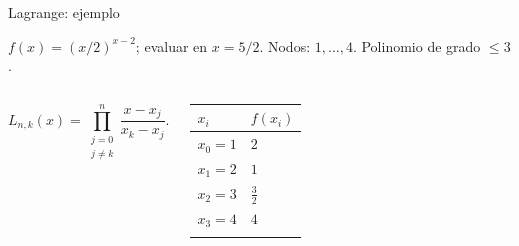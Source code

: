 \documentclass[original_version/main.tex]{subfiles}
\begin{document}
\begin{frame}[t]{Lagrange: ejemplo}
\par\noindent\begin{minipage}[t][7.5mm][t]{\textwidth}\small\strut $f(x)=(x/2)^{x-2}$; evaluar en $x=5/2$. Nodos: $1,\ldots,4$. Polinomio de grado $\le 3$.\end{minipage}\par\nointerlineskip
\begin{columns}[T]\small\setlength{\abovedisplayskip}{4pt}\setlength{\belowdisplayskip}{4pt}\[L_{n,k}(x)=\prod_{\substack{j=0\\j\ne k}}^n\frac{x-x_j}{x_k-x_j}.\]\begingroup\small\setlength{\tabcolsep}{3pt}\begin{center}\begin{tabular}{|C{.42\textwidth}|C{.42\textwidth}|}\hline
\rule[-2mm]{0pt}{6mm}$x_i$&$f(x_i)$\\\hline
\rule[-2.5mm]{0pt}{6mm}$x_0=1$&$2$\\\hline
\rule[-2.5mm]{0pt}{6mm}$x_1=2$&$1$\\\hline
\rule[-2.5mm]{0pt}{6mm}$x_2=3$&$\frac{3}{2}$\\\hline
\rule[-2.5mm]{0pt}{6mm}$x_3=4$&$4$\\\hline
\rule[-2.5mm]{0pt}{6mm}&\\\hline
\end{tabular}\end{center}\endgroup\par
\end{columns}
\end{frame}
\end{document}
